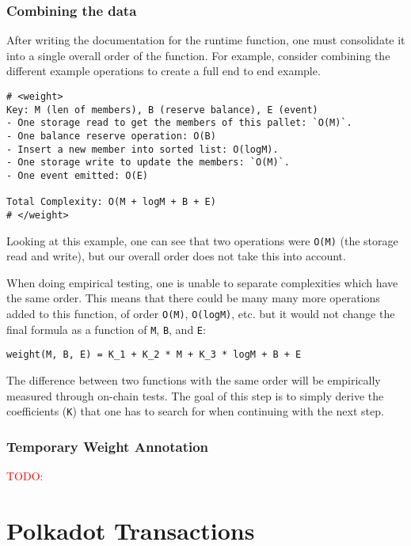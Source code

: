 \documentclass[11pt,a4paper]{article}
\newcommand{\todo}[1]{\textcolor{red}{TODO: #1}}
\begin{document}
\subsubsection{Combining the data}
After writing the documentation for the runtime function, one must consolidate
it into a single overall order of the function. For example, consider combining the
different example operations to create a full end to end example.
\newline

\begin{verbatim}
# <weight>
Key: M (len of members), B (reserve balance), E (event)
- One storage read to get the members of this pallet: `O(M)`.
- One balance reserve operation: O(B)
- Insert a new member into sorted list: O(logM).
- One storage write to update the members: `O(M)`.
- One event emitted: O(E)

Total Complexity: O(M + logM + B + E)
# </weight>
\end{verbatim}

Looking at this example, one can see that two operations were \texttt{O(M)} (the
storage read and write), but our overall order does not take this into account.
\newline

When doing empirical testing, one is unable to separate complexities which have the
same order. This means that there could be many many more operations added to this
function, of order \texttt{O(M)}, \texttt{O(logM)}, etc. but it would not change
the final formula as a function of \texttt{M}, \texttt{B}, and \texttt{E}:
\newline

\texttt{weight(M, B, E) = K\_1 + K\_2 * M + K\_3 * logM + B + E}
\newline

The difference between two functions with the same order will be empirically
measured through on-chain tests. The goal of this step is to simply derive the
coefficients (\texttt{K}) that one has to search for when continuing with the next step.

\subsubsection{Temporary Weight Annotation}
\todo{}

\section{Polkadot Transactions}
\end{document}
